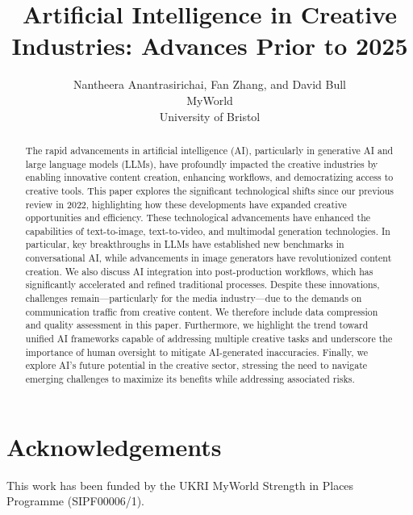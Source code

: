 \documentclass[11pt,a4paper]{article}
\date{}
\title{\Large {\bf Artificial Intelligence in Creative Industries: Advances Prior to 2025 }}
\author{Nantheera Anantrasirichai, Fan Zhang, and David Bull \\ MyWorld \\ University of Bristol}
\begin{document}
\maketitle



\begin{abstract}
   The rapid advancements in artificial intelligence (AI), particularly in generative AI and large language models (LLMs), have profoundly impacted the creative industries by enabling innovative content creation, enhancing workflows, and democratizing access to creative tools. This paper explores the significant technological shifts since our previous review in 2022, highlighting how these developments have expanded creative opportunities and efficiency. These technological advancements have enhanced the capabilities of text-to-image, text-to-video, and multimodal generation technologies. In particular, key breakthroughs in LLMs have established new benchmarks in conversational AI, while advancements in image generators have revolutionized content creation. We also discuss AI integration into post-production workflows, which has significantly accelerated and refined traditional processes. Despite these innovations, challenges remain—particularly for the media industry—due to the demands on communication traffic from creative content. We therefore include data compression and quality assessment in this paper. Furthermore, we highlight the trend toward unified AI frameworks capable of addressing multiple creative tasks and underscore the importance of human oversight to mitigate AI-generated inaccuracies. Finally, we explore AI's future potential in the creative sector, stressing the need to navigate emerging challenges to maximize its benefits while addressing associated risks.

\end{abstract}

\vspace{30 mm}

\section*{Acknowledgements}

This work has been funded by the UKRI MyWorld Strength in Places Programme (SIPF00006/1).


\newpage
\end{document}
